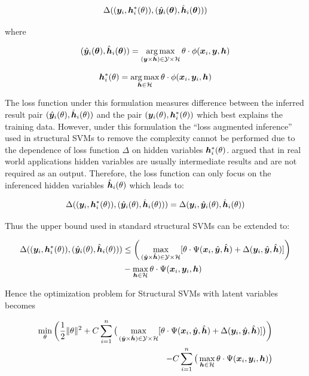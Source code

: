 $$
\Delta(({\bm{y}}_i,{\bm{h}}^*_i(\theta)),(\hat{{\bm{y}}}_i({\bm{\theta}}),\hat{{\bm{h}}}_i({\bm{\theta}})))
$$

\noindent where

\begin{align}
  \label{eq:latentssvm_full_inf}
 (\hat{{\bm{y}}}_i({\bm{\theta}}),\hat{{\bm{h}}}_i({\bm{\theta}}))=\operatorname*{arg\,max}_{({\bm{y}}
  \times {\bm{h}}) \in \mathcal{Y} \times \mathcal{H}}
\theta\cdot\phi({\bm{x}}_i,{\bm{y}},{\bm{h}})
\end{align}

\begin{align}
  \label{eq:latentssvm_latent_inf}
  {\bm{h}}^*_i(\theta) = \operatorname*{arg\,max}_{{\bm{h}} \in \mathcal{H}} \theta \cdot
  \phi({\bm{x}}_i,{\bm{y}}_i,{\bm{h}})
\end{align}

The loss function under this formulation measures difference
between the inferred result pair $(\hat{{\bm{y}}}_i(\theta),
\hat{{\bm{h}}}_i(\theta))$ and the pair $({\bm{y}}_i(\theta),
{\bm{h}}_i^*(\theta))$ which best explains the training data. However,
under this formulation the ``loss augmented inference'' used in
structural SVMs\cite{tsochantaridis2005large} to remove the
complexity cannot be performed due to the dependence of loss
function $\Delta$ on hidden variables ${\bm{h}}^*_i(\theta)$.
 argued that in real world applications
hidden variables are usually intermediate results and are not
required as an output\cite{yu2009learning}. Therefore, the loss
function can only focus on the inferenced hidden variables
$\hat{{\bm{h}}}_i(\theta)$ which leads to:

$$
\Delta(({\bm{y}}_i,{\bm{h}}^*_i(\theta)),(\hat{{\bm{y}}}_i(\theta),\hat{{\bm{h}}}_i(\theta)))
=
\Delta({\bm{y}}_i,\hat{{\bm{y}}}_i(\theta),\hat{{\bm{h}}}_i(\theta))
$$

Thus the upper bound used in standard structural
SVMs\cite{tsochantaridis2005large} can be extended to:

\begin{align}
  \nonumber\Delta(({\bm{y}}_i,{\bm{h}}^*_i(\theta)),(\hat{{\bm{y}}}_i(\theta),\hat{{\bm{h}}}_i(\theta)))
  &\leq \bigg(\max_{(\hat{{\bm{y}}} \times \hat{{\bm{h}}}) \in
    \mathcal{Y} \times \mathcal{H}}
    [\theta\cdot\Psi({\bm{x}}_i,\hat{{\bm{y}}},\hat{{\bm{h}}}) +
    \Delta({\bm{y}}_i,\hat{{\bm{y}}},\hat{{\bm{h}}})]\bigg)\\
  &-\max_{{\bm{h}} \in \mathcal{H}} \theta \cdot
    \Psi({\bm{x}}_i,{\bm{y}}_i,{\bm{h}})
\end{align}

Hence the optimization problem for Structural SVMs with latent
variables becomes

\begin{align}
\label{eq:latent_ssvm_object}
  \min_\theta\bigg(\frac{1}{2}\|\theta\|^2+
  C\sum_{i=1}^{n}\big(\max_{(\hat{{\bm{y}}} \times
  \hat{{\bm{h}}}) \in \mathcal{Y} \times \mathcal{H}}
  [\theta\cdot\Psi({\bm{x}}_i,\hat{{\bm{y}}},\hat{{\bm{h}}}) +
  \Delta({\bm{y}}_i,\hat{{\bm{y}}},\hat{{\bm{h}}})]\big)\bigg)\\
  -C\sum_{i=1}^{n}\big(\max_{{\bm{h}} \in \mathcal{H}} \theta \cdot
  \Psi({\bm{x}}_i,{\bm{y}}_i,{\bm{h}})\big)\nonumber
\end{align}

